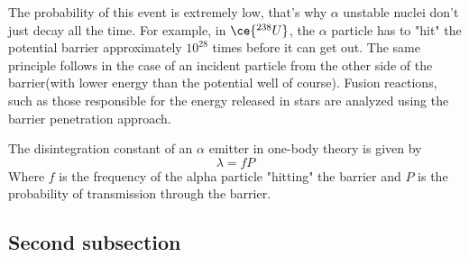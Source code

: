 The probability of this event is extremely low, that's why $\alpha$ unstable 
nuclei don't just decay all the time. For example, in $\ce{^{238}U}$, the $\alpha$ particle has to "hit" the 
potential barrier approximately $10^28$ times before it can get out. The same principle follows in the 
case of an incident particle from the other side of the barrier(with lower energy than the potential well of course). 
Fusion reactions, such as those responsible for the energy released in stars are analyzed using the barrier penetration approach.

The disintegration constant of an $\alpha$ emitter in one-body theory is given by 
$$\lambda=fP$$
Where $f$ is the frequency of the alpha particle "hitting" the barrier and $P$ is the probability of transmission through the barrier.




\subsection{Second subsection}